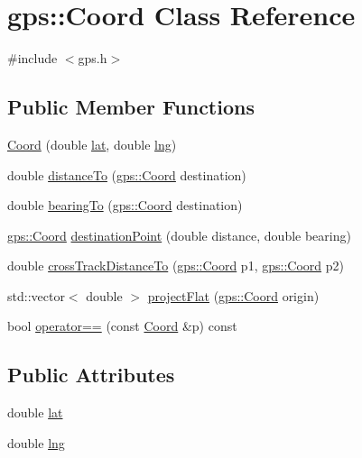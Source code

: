 \hypertarget{classgps_1_1Coord}{}\section{gps\+:\+:Coord Class Reference}
\label{classgps_1_1Coord}


{\ttfamily \#include $<$gps.\+h$>$}

\subsection*{Public Member Functions}
\begin{DoxyCompactItemize}
\item 
\hyperlink{classgps_1_1Coord_afcc45fae837b48cd7d9bd545c4dc574c}{Coord} (double \hyperlink{classgps_1_1Coord_a17cbbd7580a83c42f650b8f93e14d98e}{lat}, double \hyperlink{classgps_1_1Coord_abca98aaabe2dc3cf50ebdd687c2f47e8}{lng})
\item 
double \hyperlink{classgps_1_1Coord_a335589710eec94e6062323ef5c8994ab}{distance\+To} (\hyperlink{classgps_1_1Coord}{gps\+::\+Coord} destination)
\item 
double \hyperlink{classgps_1_1Coord_a3d3d160c28334979d220dce4112e087d}{bearing\+To} (\hyperlink{classgps_1_1Coord}{gps\+::\+Coord} destination)
\item 
\hyperlink{classgps_1_1Coord}{gps\+::\+Coord} \hyperlink{classgps_1_1Coord_ae76a605c81049d648d4e39ee0f56ff7b}{destination\+Point} (double distance, double bearing)
\item 
double \hyperlink{classgps_1_1Coord_a0efb59b2c1fa68551f118bcea3733593}{cross\+Track\+Distance\+To} (\hyperlink{classgps_1_1Coord}{gps\+::\+Coord} p1, \hyperlink{classgps_1_1Coord}{gps\+::\+Coord} p2)
\item 
std\+::vector$<$ double $>$ \hyperlink{classgps_1_1Coord_ac2e47c5d6d9a3d54a4086e8003fc7e9a}{project\+Flat} (\hyperlink{classgps_1_1Coord}{gps\+::\+Coord} origin)
\item 
bool \hyperlink{classgps_1_1Coord_a6e0f9d8bff57711675b435ca75fc6183}{operator==} (const \hyperlink{classgps_1_1Coord}{Coord} \&p) const 
\end{DoxyCompactItemize}
\subsection*{Public Attributes}
\begin{DoxyCompactItemize}
\item 
double \hyperlink{classgps_1_1Coord_a17cbbd7580a83c42f650b8f93e14d98e}{lat}
\item 
double \hyperlink{classgps_1_1Coord_abca98aaabe2dc3cf50ebdd687c2f47e8}{lng}
\end{DoxyCompactItemize}


